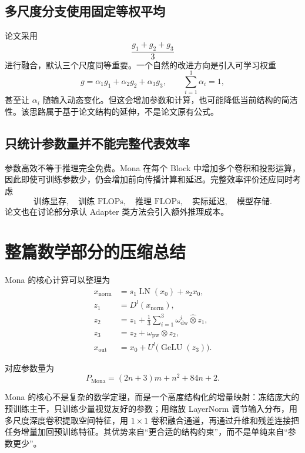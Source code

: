 \documentclass[UTF8,12pt,a4paper,fontset=none]{ctexart}
\newcommand{\LN}{\operatorname{LN}}
\newcommand{\GeLU}{\operatorname{GeLU}}
\begin{document}
\subsection{多尺度分支使用固定等权平均}

论文采用
\begin{equation}
 \frac{g_1+g_2+g_3}{3}
\end{equation}
进行融合，默认三个尺度同等重要。一个自然的改进方向是引入可学习权重
\begin{equation}
 g=\alpha_1g_1+\alpha_2g_2+\alpha_3g_3,
\qquad
 \sum_{i=1}^{3}\alpha_i=1,
\end{equation}
甚至让 $\alpha_i$ 随输入动态变化。但这会增加参数和计算，也可能降低当前结构的简洁性。该思路属于基于论文结构的延伸，不是论文原有公式。

\subsection{只统计参数量并不能完整代表效率}

参数高效不等于推理完全免费。Mona 在每个 Block 中增加多个卷积和投影运算，因此即使可训练参数少，仍会增加前向传播计算和延迟。完整效率评价还应同时考虑
\begin{equation}
 \text{训练显存},\quad
 \text{训练 FLOPs},\quad
 \text{推理 FLOPs},\quad
 \text{实际延迟},\quad
 \text{模型存储}.
\end{equation}
论文也在讨论部分承认 Adapter 类方法会引入额外推理成本。

\section{整篇数学部分的压缩总结}

Mona 的核心计算可以整理为
\begin{align}
 x_{\mathrm{norm}}
 &=s_1\LN(x_0)+s_2x_0,\\
 z_1&=D^l(x_{\mathrm{norm}}),\\
 z_2&=z_1+\frac{1}{3}\sum_{i=1}^{3}
 \omega_{\mathrm{dw}}^i\widehat{\otimes}z_1,\\
 z_3&=z_2+\omega_{\mathrm{pw}}\otimes z_2,\\
 x_{\mathrm{out}}
 &=x_0+U^l\bigl(\GeLU(z_3)\bigr).
\end{align}

对应参数量为
\begin{equation}
 \boxed{P_{\mathrm{Mona}}=(2n+3)m+n^2+84n+2}.
\end{equation}

\begin{conclusionbox}[最终理解]
Mona 的核心不是复杂的数学定理，而是一个高度结构化的增量映射：冻结庞大的预训练主干，只训练少量视觉友好的参数；用缩放 LayerNorm 调节输入分布，用多尺度深度卷积提取空间特征，用 $1\times1$ 卷积融合通道，再通过升维和残差连接把任务增量加回预训练特征。其优势来自“更合适的结构约束”，而不是单纯来自“参数更少”。
\end{conclusionbox}
\end{document}
